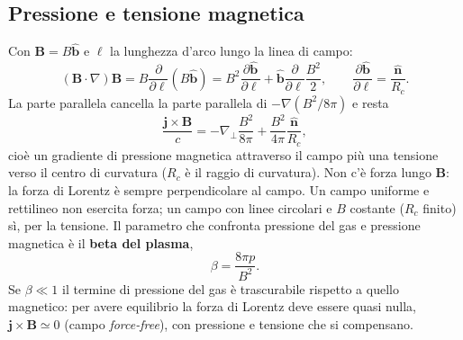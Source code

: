 \subsection{Pressione e tensione magnetica}
Con $\mathbf{B}=B\hat{\mathbf{b}}$ e $\ell$ la lunghezza d'arco lungo la linea di campo:
\begin{equation}
(\mathbf{B}\cdot\nabla)\mathbf{B}=B\frac{\partial}{\partial\ell}(B\hat{\mathbf{b}})=B^2\frac{\partial\hat{\mathbf{b}}}{\partial\ell}+\hat{\mathbf{b}}\frac{\partial}{\partial\ell}\frac{B^2}{2},\qquad\frac{\partial\hat{\mathbf{b}}}{\partial\ell}=\frac{\hat{\mathbf{n}}}{R_c} .
\end{equation}
La parte parallela cancella la parte parallela di $-\nabla(B^2/8\pi)$ e resta
\begin{equation}
\frac{\mathbf{j}\times\mathbf{B}}{c}=-\nabla_\perp\frac{B^2}{8\pi}+\frac{B^2}{4\pi}\frac{\hat{\mathbf{n}}}{R_c},
\end{equation}
cioè un gradiente di pressione magnetica attraverso il campo più una tensione verso il centro di curvatura ($R_c$ è il raggio di curvatura). Non c'è forza lungo $\mathbf{B}$: la forza di Lorentz è sempre perpendicolare al campo. Un campo uniforme e rettilineo non esercita forza; un campo con linee circolari e $B$ costante ($R_c$ finito) sì, per la tensione.
Il parametro che confronta pressione del gas e pressione magnetica è il \textbf{beta del plasma},
\begin{equation}
\beta=\frac{8\pi p}{B^2}.
\end{equation}
Se $\beta\ll1$ il termine di pressione del gas è trascurabile rispetto a quello magnetico: per avere equilibrio la forza di Lorentz deve essere quasi nulla, $\mathbf{j}\times\mathbf{B}\simeq0$ (campo \emph{force-free}), con pressione e tensione che si compensano.

